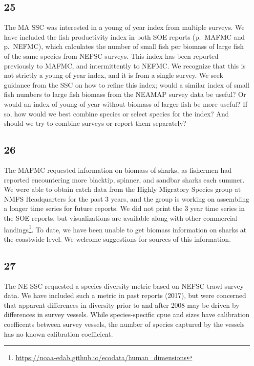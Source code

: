 \documentclass[
  10pt,
]{article}
\begin{document}
\hypertarget{section-24}{%
\subsection{25}\label{section-24}}

The MA SSC was interested in a young of year index from multiple
surveys. We have included the fish productivity index in both SOE
reports (p.~MAFMC and p.~NEFMC), which calculates the number of small
fish per biomass of large fish of the same species from NEFSC surveys.
This index has been reported previously to MAFMC, and intermittently to
NEFMC. We recognize that this is not strictly a young of year index, and
it is from a single survey. We seek guidance from the SSC on how to
refine this index; would a similar index of small fish numbers to large
fish biomass from the NEAMAP survey data be useful? Or would an index of
young of year without biomass of larger fish be more useful? If so, how
would we best combine species or select species for the index? And
should we try to combine surveys or report them separately?

\hypertarget{section-25}{%
\subsection{26}\label{section-25}}

The MAFMC requested information on biomass of sharks, as fishermen had
reported encountering more blacktip, spinner, and sandbar sharks each
summer. We were able to obtain catch data from the Highly Migratory
Species group at NMFS Headquarters for the past 3 years, and the group
is working on assembling a longer time series for future reports. We did
not print the 3 year time series in the SOE reports, but visualizations
are available along with other commercial landings\footnote{\url{https://noaa-edab.github.io/ecodata/human_dimensions}}.
To date, we have been unable to get biomass information on sharks at the
coastwide level. We welcome suggestions for sources of this information.

\hypertarget{section-26}{%
\subsection{27}\label{section-26}}

The NE SSC requested a species diversity metric based on NEFSC trawl
survey data. We have included such a metric in past reports (2017), but
were concerned that apparent differences in diversity prior to and after
2008 may be driven by differences in survey vessels. While
species-specific cpue and sizes have calibration coefficents between
survey vessels, the number of species captured by the vessels has no
known calibration coefficient.
\end{document}
